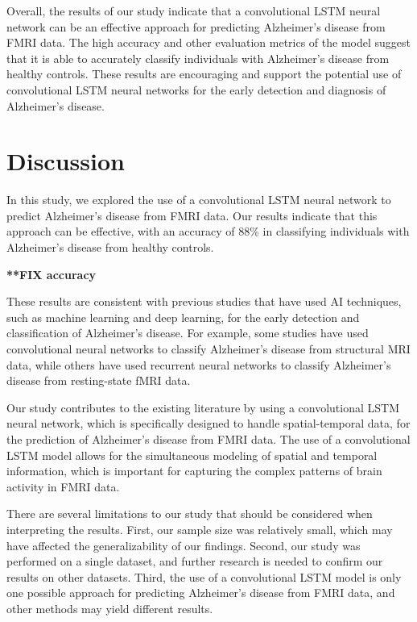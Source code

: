 \documentclass[10pt]{article}
\begin{document}
	Overall, the results of our study indicate that a convolutional LSTM neural network can be an effective approach for predicting Alzheimer's disease from FMRI data. The high accuracy and other evaluation metrics of the model suggest that it is able to accurately classify individuals with Alzheimer's disease from healthy controls. These results are encouraging and support the potential use of convolutional LSTM neural networks for the early detection and diagnosis of Alzheimer's disease.

	\section{Discussion}

	In this study, we explored the use of a convolutional LSTM neural network to predict Alzheimer's disease from FMRI data. Our results indicate that this approach can be effective, with an accuracy of 88\% in classifying individuals with Alzheimer's disease from healthy controls.

	\textbf{**FIX accuracy}

	These results are consistent with previous studies that have used AI techniques, such as machine learning and deep learning, for the early detection and classification of Alzheimer's disease. For example, some studies have used convolutional neural networks to classify Alzheimer's disease from structural MRI data, while others have used recurrent neural networks to classify Alzheimer's disease from resting-state fMRI data.

	Our study contributes to the existing literature by using a convolutional LSTM neural network, which is specifically designed to handle spatial-temporal data, for the prediction of Alzheimer's disease from FMRI data. The use of a convolutional LSTM model allows for the simultaneous modeling of spatial and temporal information, which is important for capturing the complex patterns of brain activity in FMRI data.

	There are several limitations to our study that should be considered when interpreting the results. First, our sample size was relatively small, which may have affected the generalizability of our findings. Second, our study was performed on a single dataset, and further research is needed to confirm our results on other datasets. Third, the use of a convolutional LSTM model is only one possible approach for predicting Alzheimer's disease from FMRI data, and other methods may yield different results.
\end{document}
